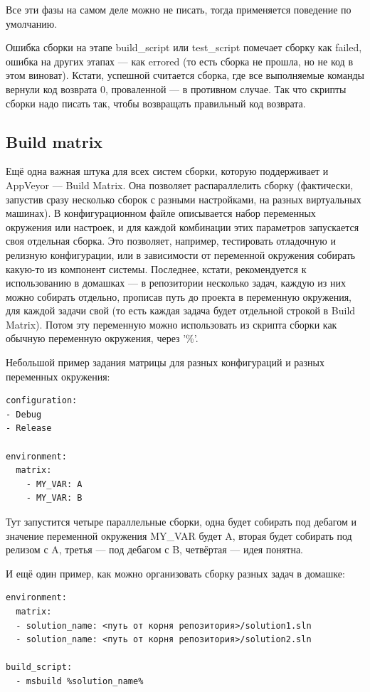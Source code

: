 \documentclass[a5paper]{article}
\begin{document}
 Все эти фазы на самом деле можно не писать, тогда применяется поведение по умолчанию. 
 
 Ошибка сборки на этапе build\_script или test\_script помечает сборку как failed, ошибка на других этапах --- как errored (то есть сборка не прошла, но не код в этом виноват). Кстати, успешной считается сборка, где все выполняемые команды вернули код возврата 0, проваленной --- в противном случае. Так что скрипты сборки надо писать так, чтобы возвращать правильный код возврата.

\subsection{Build matrix}

Ещё одна важная штука для всех систем сборки, которую поддерживает и AppVeyor --- Build Matrix. Она позволяет распараллелить сборку (фактически, запустив сразу несколько сборок с разными настройками, на разных виртуальных машинах). В конфигурационном файле описывается набор переменных окружения или настроек, и для каждой комбинации этих параметров запускается своя отдельная сборка. Это позволяет, например, тестировать отладочную и релизную конфигурации, или в зависимости от переменной окружения собирать какую-то из компонент системы. Последнее, кстати, рекомендуется к использованию в домашках --- в репозитории несколько задач, каждую из них можно собирать отдельно, прописав путь до проекта в переменную окружения, для каждой задачи свой (то есть каждая задача будет отдельной строкой в Build Matrix). Потом эту переменную можно использовать из скрипта сборки как обычную переменную окружения, через '\%'.

Небольшой пример задания матрицы для разных конфигураций и разных переменных окружения:

\begin{verbatim}
configuration:
- Debug
- Release

environment:
  matrix:
    - MY_VAR: A
    - MY_VAR: B
\end{verbatim}

Тут запустится четыре параллельные сборки, одна будет собирать под дебагом и значение переменной окружения MY\_VAR будет A, вторая будет собирать под релизом с A, третья --- под дебагом с B, четвёртая --- идея понятна.

И ещё один пример, как можно организовать сборку разных задач в домашке:

\begin{verbatim}
environment:
  matrix:
  - solution_name: <путь от корня репозитория>/solution1.sln
  - solution_name: <путь от корня репозитория>/solution2.sln

build_script:
  - msbuild %solution_name%
\end{verbatim}
\end{document}
